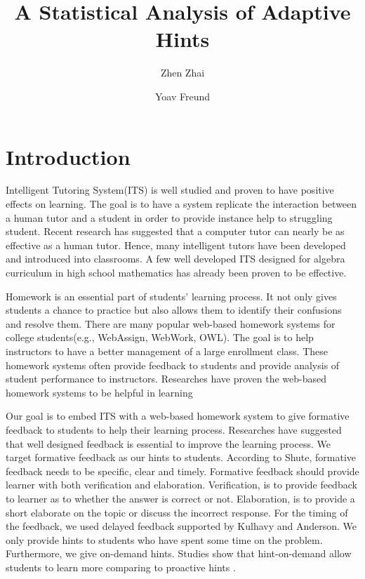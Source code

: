 \documentclass{llncs}
\title{A Statistical Analysis of Adaptive Hints}
\author{Zhen Zhai\inst{1} \and Yoav Freund\inst{2}}
\institute{UC San Diego \email{zzhai@eng.ucsd.edu} \and UC San Diego \email{yfreund@eng.ucsd.edu}}
\begin{document}
\maketitle


\begin{abstract}

\end{abstract}


\section{Introduction}
Intelligent Tutoring System(ITS) is well studied and proven to have positive effects on learning\cite{Anderson1995}. The goal is to have a system replicate the interaction between a human tutor and a student in order to provide instance help to struggling student. Recent research has suggested that a computer tutor can nearly be as effective as a human tutor\cite{Vanlehn2011}. Hence, many intelligent tutors have been developed and introduced into classrooms. A few well developed ITS designed for algebra curriculum in high school mathematics has already been proven to be effective\cite{Koedinger1997}\cite{John2014}.

Homework is an essential part of students' learning process\cite{Cooper2006}. It not only gives students a chance to practice but also allows them to identify their confusions and resolve them. There are many popular web-based homework systems for college students(e.g., WebAssign, WebWork, OWL). The goal is to help instructors to have a better management of a large enrollment class. These homework systems often provide feedback to students and provide analysis of student performance to instructors. Researches have proven the web-based homework systems to be helpful in learning\cite{MestHartRath2002}\cite{Vanlehn2005}

Our goal is to embed ITS with a web-based homework system to give formative feedback to students to help their learning process. Researches have suggested that well designed feedback is essential to improve the learning process\cite{Azevedo1995}\cite{Bangert-Drowns1991}. We target formative feedback as our hints to students. According to Shute, formative feedback needs to be specific, clear and timely\cite{Shute2008}. Formative feedback should provide learner with both verification and elaboration\cite{Mason2001}\cite{Bangert-Drowns1991}. Verification, is to provide feedback to learner as to whether the answer is correct or not. Elaboration, is to provide a short elaborate on the topic or discuss the incorrect response. For the timing of the feedback, we used delayed feedback supported by Kulhavy and Anderson\cite{Kulhavy1972}. We only provide hints to students who have spent some time on the problem. Furthermore, we give on-demand hints. Studies show that hint-on-demand allow students to learn more comparing to proactive hints \cite{Razzaq2010}.
\end{document}
